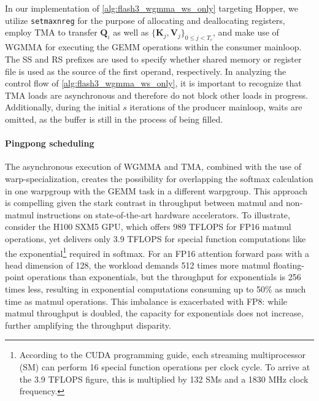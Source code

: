 In our implementation of \cref{alg:flash3_wgmma_ws_only} targeting Hopper, we utilize \verb|setmaxnreg| for the purpose of allocating and deallocating registers, employ TMA to transfer $\mathbf{Q}_i$ as well as $\{ \mathbf{K}_j, \mathbf{V}_j \}_{0 \leq j < T_c}$, and make use of WGMMA for executing the GEMM operations within the consumer mainloop. The SS and RS prefixes are used to specify whether shared memory or register file is used as the source of the first operand, respectively. In analyzing the control flow of \cref{alg:flash3_wgmma_ws_only}, it is important to recognize that TMA loads are asynchronous and therefore do not block other loads in progress. Additionally, during the initial $s$ iterations of the producer mainloop, waits are omitted, as the buffer is still in the process of being filled.

\paragraph{Pingpong scheduling} The asynchronous execution of WGMMA and TMA, combined with the use of warp-specialization, creates the possibility for overlapping the softmax calculation in one warpgroup with the GEMM task in a different warpgroup. This approach is compelling given the stark contrast in throughput between matmul and non-matmul instructions on state-of-the-art hardware accelerators. To illustrate, consider the H100 SXM5 GPU, which offers 989 TFLOPS for FP16 matmul operations, yet delivers only 3.9 TFLOPS for special function computations like the exponential\footnote{According to the CUDA programming guide, each streaming multiprocessor (SM) can perform 16 special function operations per clock cycle. To arrive at the 3.9 TFLOPS figure, this is multiplied by 132 SMs and a 1830 MHz clock frequency.} required in softmax. For an FP16 attention forward pass with a head dimension of 128, the workload demands 512 times more matmul floating-point operations than exponentials, but the throughput for exponentials is 256 times less, resulting in exponential computations consuming up to 50\% as much time as matmul operations. This imbalance is exacerbated with FP8: while matmul throughput is doubled, the capacity for exponentials does not increase, further amplifying the throughput disparity.


